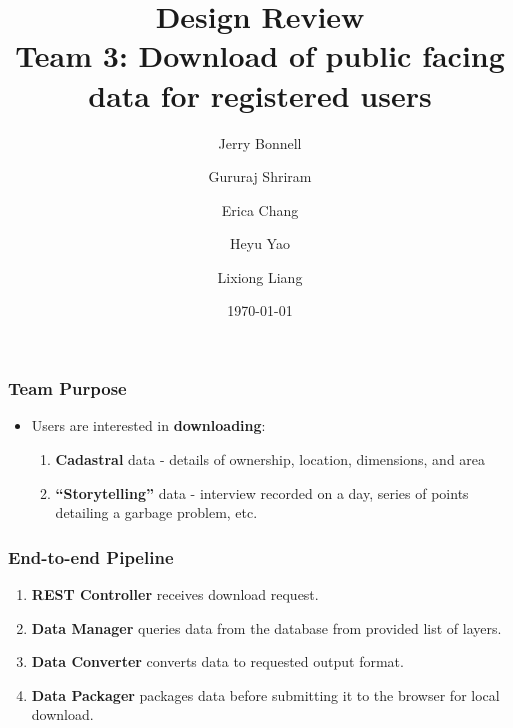 \documentclass[xcolor=table]{beamer}
\title{
\textbf{Design Review} \\ \small{Team 3: Download of public facing data for registered users}
}
\author{
Jerry Bonnell
\and Gururaj Shriram
\and Erica Chang 
\and Heyu Yao
\and Lixiong Liang
} %
\date{\today} %
\begin{document}
\begin{frame}[plain]
	\titlepage
\end{frame}

\begin{frame}
	\frametitle{Team Purpose}
	\begin{itemize}
		\item Users are interested in \textbf{downloading}:
		      \begin{block}{}
			      \begin{enumerate}
					  \item \textbf{Cadastral} data - details of ownership, 
					  location, dimensions, and area
					  \item \textbf{``Storytelling''} data - interview 
					  recorded on a day, series of points detailing a garbage 
					  problem, etc.
			      \end{enumerate}
			  \end{block}
	\end{itemize}
\end{frame}
\begin{frame}
	\frametitle{End-to-end Pipeline}
	\begin{enumerate}
		\item \textbf{REST Controller} receives download request.
		\item \textbf{Data Manager} queries data from the database from 
		provided list of layers. 
		\item \textbf{Data Converter} converts data to requested output format.
		\item \textbf{Data Packager} packages data before submitting 
		it to the browser for local download.
	\end{enumerate}
\end{frame}
\end{document}
